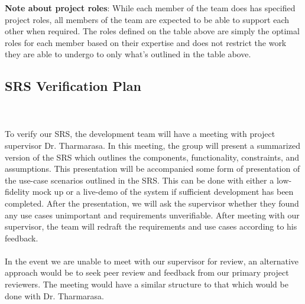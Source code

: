 \documentclass[12pt, titlepage]{article}
\begin{document}
\textbf{Note about project roles}: While each member of the team does has specified project roles, all members of the team are expected to be able to support each other when required. The roles defined on the table above are simply the optimal roles for each member based on their expertise and does not restrict the work they are able to undergo to only what's outlined in the table above.

\subsection{SRS Verification Plan}


\\
\\

To verify our SRS, the development team will have a meeting with project supervisor Dr. Tharmarasa. In this meeting, the group will present a summarized version of the SRS which outlines the components, functionality, constraints, and assumptions. This presentation will be accompanied some form of presentation of the use-case scenarios outlined in the SRS. This can be done with either a low-fidelity mock up or a live-demo of the system if sufficient development has been completed. After the presentation, we will ask the supervisor whether they found any use cases unimportant and requirements unverifiable. After meeting with our supervisor, the team will redraft the requirements and use cases according to his feedback. \\\\
In the event we are unable to meet with our supervisor for review, an alternative approach would be to seek peer review and feedback from our primary project reviewers. The meeting would have a similar structure to that which would be done with Dr. Tharmarasa. \\\\
\end{document}
